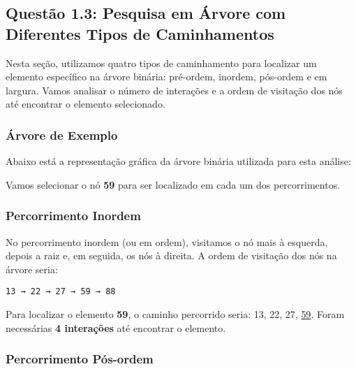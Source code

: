 \documentclass{article}
\begin{document}
\begin{center}
\subsection{Questão 1.3: Pesquisa em Árvore com Diferentes Tipos de Caminhamentos}

Nesta seção, utilizamos quatro tipos de caminhamento para localizar um elemento específico na árvore binária: pré-ordem, inordem, pós-ordem e em largura. Vamos analisar o número de interações e a ordem de visitação dos nós até encontrar o elemento selecionado.

\subsubsection{Árvore de Exemplo}

Abaixo está a representação gráfica da árvore binária utilizada para esta análise:

\end{center}
\begin{center}

Vamos selecionar o nó \textbf{59} para ser localizado em cada um dos percorrimentos.

\end{center}
\subsubsection{Percorrimento Inordem}

No percorrimento inordem (ou em ordem), visitamos o nó mais à esquerda, depois a raiz e, em seguida, os nós à direita. A ordem de visitação dos nós na árvore seria:

\begin{verbatim}
13 → 22 → 27 → 59 → 88
\end{verbatim}

\noindent
Para localizar o elemento \textbf{59}, o caminho percorrido seria: 13, 22, 27, \underline{59}. Foram necessárias \textbf{4 interações} até encontrar o elemento.

\subsubsection{Percorrimento Pós-ordem}
\end{document}
